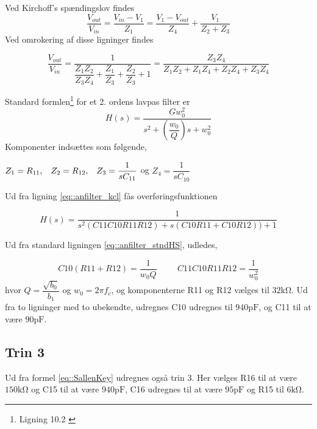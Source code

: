 Ved Kirchoff's spændingslov findes\\
\begin{equation}
	\dfrac{V_{out}}{V_{in}} = \dfrac{V_{in}-V_1}{Z_1} = \dfrac{V_1 - V_{out}}{Z_4}+\dfrac{V_1}{Z_2+Z_3}
\end{equation}
Ved omrokering af disse ligninger findes

\begin{equation}\label{eq::anfilter_kcl}
	\dfrac{V_{out}}{V_{in}} = \dfrac{1}{\dfrac{Z_1Z_2}{Z_3Z_4}+\dfrac{Z_1}{Z_3}+\dfrac{Z_2}{Z_3}+1} = \dfrac{Z_3Z_4}{Z_1Z_2+Z_1Z_4+Z_2Z_4+Z_3Z_4}
\end{equation}

Standard formlen\footnote{Ligning 10.2 \cite[s. 218]{Su2002}}
 for et 2. ordens lavpas filter er
\begin{equation}\label{eq::anfilter_stndHS}
H(s) = \dfrac{Gw_0^2}{s^2 + \left(\dfrac{w_0}{Q}\right)s+w_0^2}
\end{equation}
Komponenter indsættes som følgende,
\begin{center}
	$Z_1 = R_{11}, \hspace{3mm} Z_2 = R_{12}, \hspace{3mm} Z_3 = \dfrac{1}{sC_{11}}$ \hspace{0.5mm} og \hspace{0.5mm} $Z_4 = \dfrac{1}{sC_{10}}$
\end{center}

Ud fra ligning \ref{eq::anfilter_kcl} fås overføringsfunktionen


\begin{equation}
H(s) = \dfrac{1}{s^2(C11C10R11R12)+s(C10R11+C10R12))+1}
\label{eq::SallenKey}
\end{equation}
 





Ud fra standard ligningen \ref{eq::anfilter_stndHS}, udledes,

\begin{equation}
	 C10(R11+R12) = \dfrac{1}{w_0 Q} \hspace{1cm} C11  C10  R11  R12 = \dfrac{1}{w_0^2} \nonumber
\end{equation}
hvor $Q = \dfrac{\sqrt{b_0}}{b_1}$ og $w_0 = 2\pi f_c$, og komponenterne R11 og R12 vælges til $32\si{\kilo\ohm}$. Ud fra to ligninger med to ubekendte, udregnes C10 udregnes til $940\si{\pico\farad}$, og C11 til at være $90 \si{\pico\farad}$.
\subsection{Trin 3}
Ud fra formel \ref{eq::SallenKey} udregnes også trin 3. Her vælges R16 til at være $150\si{\kilo\ohm}$ og C15 til at være $940\si{\pico\farad}$, C16 udregnes til at være $95\si{\pico\farad}$ og R15 til $6 \si{\kilo\ohm} $. 

